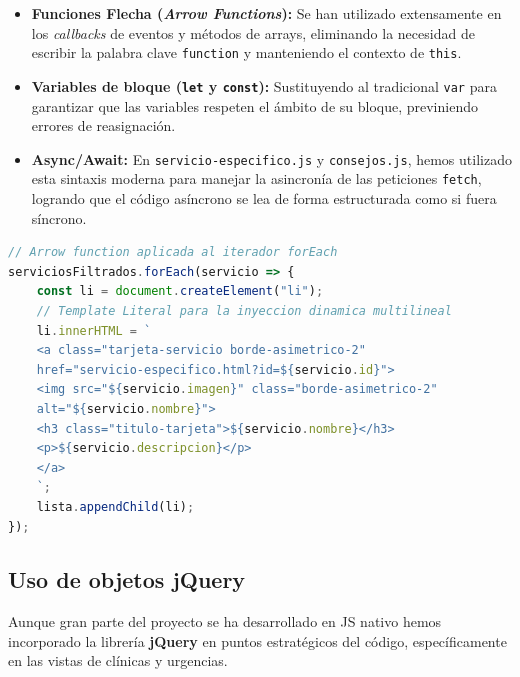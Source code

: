 \documentclass[11pt]{article}
\begin{document}
\begin{itemize}
\item \textbf{Funciones Flecha (\textit{Arrow Functions}):} Se han utilizado extensamente en los \textit{callbacks} de eventos y métodos de arrays, eliminando la necesidad de escribir la palabra clave \texttt{function} y manteniendo el contexto de \texttt{this}.
\item \textbf{Variables de bloque (\texttt{let} y \texttt{const}):} Sustituyendo al tradicional \texttt{var} para garantizar que las variables respeten el ámbito de su bloque, previniendo errores de reasignación.
\item \textbf{Async/Await:} En \texttt{servicio-especifico.js} y \texttt{consejos.js}, hemos utilizado esta sintaxis moderna para manejar la asincronía de las peticiones \texttt{fetch}, logrando que el código asíncrono se lea de forma estructurada como si fuera síncrono.
\end{itemize}

\begin{lstlisting}[language=JavaScript, caption=Ejemplo del uso de ES6 con Arrow Functions y Template Literals en servicios.js]
// Arrow function aplicada al iterador forEach
serviciosFiltrados.forEach(servicio => {
	const li = document.createElement("li");
	// Template Literal para la inyeccion dinamica multilineal
	li.innerHTML = `
	<a class="tarjeta-servicio borde-asimetrico-2"
	href="servicio-especifico.html?id=${servicio.id}">
	<img src="${servicio.imagen}" class="borde-asimetrico-2"
	alt="${servicio.nombre}">
	<h3 class="titulo-tarjeta">${servicio.nombre}</h3>
	<p>${servicio.descripcion}</p>
	</a>
	`;
	lista.appendChild(li);
});
\end{lstlisting}

\subsection{Uso de objetos jQuery}

Aunque gran parte del proyecto se ha desarrollado en JS nativo hemos incorporado la librería \textbf{jQuery} en puntos estratégicos del código, específicamente en las vistas de clínicas y urgencias.
\end{document}
